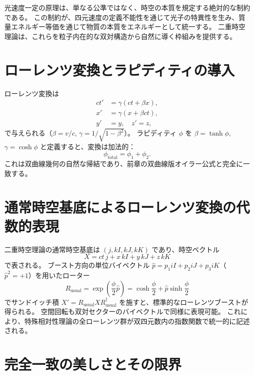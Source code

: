 \documentclass[dvipdfmx,a4paper]{jsbook}
\theoremstyle{definition}
\theoremstyle{remark}
\begin{document}
光速度一定の原理は、単なる公準ではなく、時空の本質を規定する絶対的な制約である。  
この制約が、四元速度の定義不能性を通じて光子の特異性を生み、質量エネルギー等価を通じて物質の本質をエネルギーとして統一する。  
二重時空理論は、これらを粒子内在的な双対構造から自然に導く枠組みを提供する。

\section{ローレンツ変換とラピディティの導入}
\label{sec:lorentz-rapidity}

ローレンツ変換は
\begin{align}
  ct' &= \gamma (ct + \beta x), \\
  x' &= \gamma (x + \beta ct), \\
  y' &= y, \quad z' = z,
\end{align}
で与えられる（$\beta = v/c$, $\gamma = 1/\sqrt{1-\beta^2}$）。
ラピディティ $\phi$ を $\beta = \tanh\phi$, $\gamma = \cosh\phi$ と定義すると、変換は加法的：
\begin{equation}
  \phi_{\text{total}} = \phi_1 + \phi_2.
\end{equation}
これは双曲線幾何の自然な帰結であり、前章の双曲線版オイラー公式と完全に一致する。

\section{通常時空基底によるローレンツ変換の代数的表現}
\label{sec:usual-spacetime-lorentz}

二重時空理論の通常時空基底は $(j, kI, kJ, kK)$ であり、時空ベクトル
\begin{equation}
  X = ct \, j + x \, kI + y \, kJ + z \, kK
\end{equation}
で表される。
ブースト方向の単位バイベクトル $\hat{p} = p_1 iI + p_2 iJ + p_3 iK$（$\hat{p}^2 = +1$）を用いたローター
\begin{equation}
  R_{\text{usual}} = \exp\!\left( \frac{\phi}{2} \hat{p} \right) = \cosh\frac{\phi}{2} + \hat{p} \sinh\frac{\phi}{2}
\end{equation}
でサンドイッチ積 $X' = R_{\text{usual}} X R_{\text{usual}}^\dagger$ を施すと、標準的なローレンツブーストが得られる。
空間回転も双対セクターのバイベクトルで同様に表現可能。
これにより、特殊相対性理論の全ローレンツ群が双四元数内の指数関数で統一的に記述される。

\section{完全一致の美しさとその限界}
\label{sec:perfect-match-limit}
\end{document}
